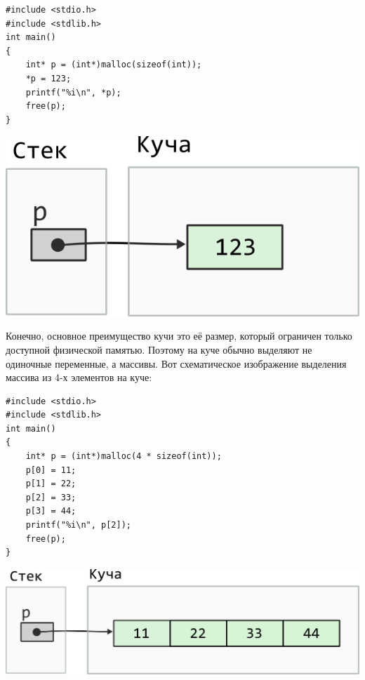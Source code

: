 \documentclass[10pt]{article}
\begin{document}
 
\noindent\begin{minipage}{.50\textwidth}
\begin{lstlisting}
#include <stdio.h>
#include <stdlib.h>
int main()
{
    int* p = (int*)malloc(sizeof(int));
    *p = 123;
    printf("%i\n", *p);
    free(p);
}
\end{lstlisting}
\end{minipage}\hfill
\begin{minipage}{.40\textwidth}
\includegraphics[scale=0.7]{../images/malloc_class_tasks/heap_int.png}
\end{minipage} 

Конечно, основное преимущество кучи это её размер, который ограничен только доступной физической памятью. Поэтому на куче обычно выделяют не одиночные переменные, а массивы. Вот схематическое изображение выделения массива из 4-х элементов на куче:\\
\noindent\begin{minipage}{.50\textwidth}
\begin{lstlisting}
#include <stdio.h>
#include <stdlib.h>
int main()
{
    int* p = (int*)malloc(4 * sizeof(int));
    p[0] = 11;
    p[1] = 22;
    p[2] = 33;
    p[3] = 44;
    printf("%i\n", p[2]);
    free(p);
}
\end{lstlisting}
\end{minipage}
\begin{minipage}{.40\textwidth}
\includegraphics[scale=0.68]{../images/malloc_class_tasks/heap_int_array.png}
\end{minipage}
\end{document}
